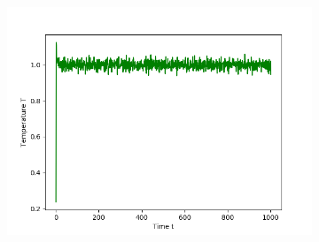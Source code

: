 \begin{figure}[ht]
\begin{subfigure}{0.3\textwidth}
\includegraphics[width=\textwidth]{../dat/Temperature_T1.0.png}
\end{subfigure}
\end{figure}


